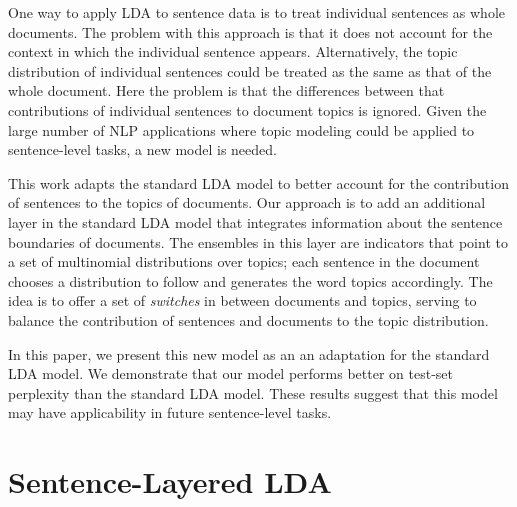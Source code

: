 One way to apply LDA to sentence data is to treat individual sentences as whole
documents.  The problem with this approach is that it does not account for the
context in which the individual sentence appears.  Alternatively, the topic
distribution of individual sentences could be treated as the same as that of
the whole document.  Here the problem is that the differences between that
contributions of individual sentences to document topics is ignored.  Given the
large number of NLP applications where topic modeling could be applied to
sentence-level tasks, a new model is needed.

This work adapts the standard LDA model to better account for the contribution
of sentences to the topics of documents.  Our approach is to add an additional
layer in the standard LDA model that integrates information about the sentence
boundaries of documents.  The ensembles in this layer are indicators that point
to a set of multinomial distributions over topics; each sentence in the
document chooses a distribution to follow and generates the word topics
accordingly.  The idea is to offer a set of \emph{switches} in between
documents and topics, serving to balance the contribution of sentences and
documents to the topic distribution.  

In this paper, we present this new model as an an adaptation for the standard
LDA model.  We demonstrate that our model performs better on test-set
perplexity than the standard LDA model.  These results suggest that this model
may have applicability in future sentence-level tasks.


\section{Sentence-Layered LDA} \label{s:sentence-layered-lda} 

